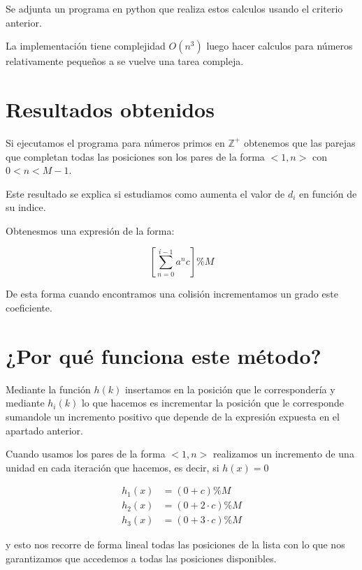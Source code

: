 \documentclass{article}
\begin{document}
Se adjunta un programa en python que realiza estos calculos usando el
criterio anterior.

La implementación tiene complejidad $O(n^3)$ luego hacer calculos para
números relativamente pequeños a se vuelve una tarea compleja.

\section{Resultados obtenidos}

Si ejecutamos el programa para números primos en $\mathbb{Z}^+$
obtenemos que las parejas que completan todas las posiciones son los
pares de la forma $<1, n>$ con $0 < n < M-1$.

Este resultado se explica si estudiamos como aumenta el valor de $d_i$
en función de su indice.

Obtenesmos una expresión de la forma:

$$ \left[ \sum_{n=0}^{i-1} a^nc \right] \% M $$

De esta forma cuando encontramos una colisión incrementamos un grado
este coeficiente.

\section{¿Por qué funciona este método?}

Mediante la función $h(k)$ insertamos en la posición que le
correspondería y mediante $h_i(k)$ lo que hacemos es incrementar la
posición que le corresponde sumandole un incremento positivo que
depende de la expresión expuesta en el apartado anterior.

Cuando usamos los pares de la forma $<1,n>$ realizamos un incremento
de una unidad en cada iteración que hacemos, es decir, si $h(x) = 0$

\begin{align*}
  h_1(x) &= (0 + c) \% M \\
  h_2(x) &= (0 + 2\cdot c) \% M \\
  h_3(x) &= (0 + 3\cdot c) \% M
\end{align*}

y esto nos recorre de forma lineal todas las posiciones de la lista
con lo que nos garantizamos que accedemos a todas las posiciones
disponibles.
\end{document}
